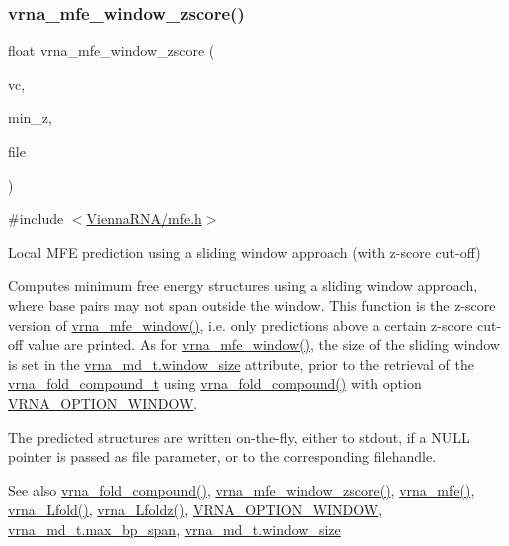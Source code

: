 \subsubsection{\texorpdfstring{vrna\+\_\+mfe\+\_\+window\+\_\+zscore()}{vrna\_mfe\_window\_zscore()}}
{\footnotesize\ttfamily float vrna\+\_\+mfe\+\_\+window\+\_\+zscore (\begin{DoxyParamCaption}\item[{\hyperlink{group__fold__compound_ga1b0cef17fd40466cef5968eaeeff6166}{vrna\+\_\+fold\+\_\+compound\+\_\+t} $\ast$}]{vc,  }\item[{double}]{min\+\_\+z,  }\item[{F\+I\+LE $\ast$}]{file }\end{DoxyParamCaption})}



{\ttfamily \#include $<$\hyperlink{mfe_8h}{Vienna\+R\+N\+A/mfe.\+h}$>$}



Local M\+FE prediction using a sliding window approach (with z-\/score cut-\/off) 

Computes minimum free energy structures using a sliding window approach, where base pairs may not span outside the window. This function is the z-\/score version of \hyperlink{group__local__mfe__fold_ga689df235a1915a1ad56e377383c044ce}{vrna\+\_\+mfe\+\_\+window()}, i.\+e. only predictions above a certain z-\/score cut-\/off value are printed. As for \hyperlink{group__local__mfe__fold_ga689df235a1915a1ad56e377383c044ce}{vrna\+\_\+mfe\+\_\+window()}, the size of the sliding window is set in the \hyperlink{group__model__details_abea42f9229f8d8d6bcbedef316315bfc}{vrna\+\_\+md\+\_\+t.\+window\+\_\+size} attribute, prior to the retrieval of the \hyperlink{group__fold__compound_ga1b0cef17fd40466cef5968eaeeff6166}{vrna\+\_\+fold\+\_\+compound\+\_\+t} using \hyperlink{group__fold__compound_ga6601d994ba32b11511b36f68b08403be}{vrna\+\_\+fold\+\_\+compound()} with option \hyperlink{group__fold__compound_ga2b2a8009ccdccc3eb1571556261aee8e}{V\+R\+N\+A\+\_\+\+O\+P\+T\+I\+O\+N\+\_\+\+W\+I\+N\+D\+OW}.

The predicted structures are written on-\/the-\/fly, either to stdout, if a N\+U\+LL pointer is passed as file parameter, or to the corresponding filehandle.

\begin{DoxySeeAlso}{See also}
\hyperlink{group__fold__compound_ga6601d994ba32b11511b36f68b08403be}{vrna\+\_\+fold\+\_\+compound()}, \hyperlink{group__local__mfe__fold_gaa4f67ae94efd08d800c17f9b53423fd6}{vrna\+\_\+mfe\+\_\+window\+\_\+zscore()}, \hyperlink{group__mfe__fold_gabd3b147371ccf25c577f88bbbaf159fd}{vrna\+\_\+mfe()}, \hyperlink{group__local__mfe__fold_ga4918cce52bf69c1913cda503b2ac75d8}{vrna\+\_\+\+Lfold()}, \hyperlink{group__local__mfe__fold_ga27fddda5fc63eb49c861e38845fc34b4}{vrna\+\_\+\+Lfoldz()}, \hyperlink{group__fold__compound_ga2b2a8009ccdccc3eb1571556261aee8e}{V\+R\+N\+A\+\_\+\+O\+P\+T\+I\+O\+N\+\_\+\+W\+I\+N\+D\+OW}, \hyperlink{group__model__details_a659e5fcc6e8c9f1a68e7de6548eef3b0}{vrna\+\_\+md\+\_\+t.\+max\+\_\+bp\+\_\+span}, \hyperlink{group__model__details_abea42f9229f8d8d6bcbedef316315bfc}{vrna\+\_\+md\+\_\+t.\+window\+\_\+size}
\end{DoxySeeAlso}

